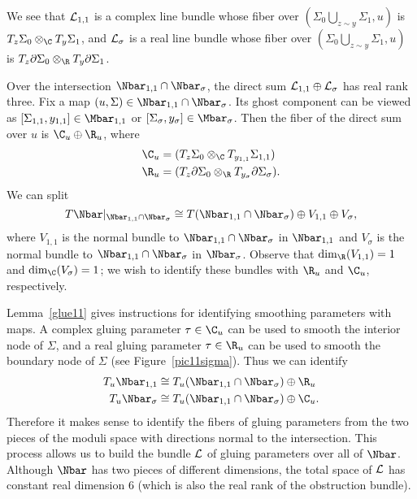 \begin{remark} \label{howToGlue11}
We see that $\mathcal{L}_{1,1}$ is a complex line bundle whose fiber over $(\Sigma_0 \bigcup_{z \sim y} \Sigma_1, u)$ is $T_z\Sigma_0 \otimes_\C T_y\Sigma_1$, and $\mathcal{L}_\sigma$ is a real line bundle whose fiber over $(\Sigma_0 \bigcup_{z \sim y} \Sigma_1, u)$ is $T_z\partial\Sigma_0 \otimes_\R T_y\partial\Sigma_1$.

Over the intersection $\Nbar_{1,1} \cap \Nbar_\sigma$, the direct sum $\mathcal{L}_{1,1} \oplus \mathcal{L}_\sigma$ has real rank three. 
Fix a map $(u,\Sigma) \in \Nbar_{1,1} \cap \Nbar_\sigma$. Its ghost component can be viewed as $[\Sigma_{1,1},y_{1,1}] \in \Mbar_{1,1}$ or $[\Sigma_\sigma,y_\sigma] \in \Mbar_\sigma$. 
Then the fiber of the direct sum over $u$ is $\C_u \oplus \R_u$, where
\begin{align*}
\C_u & = (T_z\Sigma_0 \otimes_\C T_{y_{1,1}}\Sigma_{1,1})
\\
\R_u & = (T_z\partial\Sigma_0 \otimes_\R T_{y_\sigma}\partial\Sigma_\sigma).
\end{align*}
We can split
\[
T\Nbar|_{\Nbar_{1,1} \cap \Nbar_\sigma} \cong T(\Nbar_{1,1} \cap \Nbar_\sigma) \oplus V_{1,1} \oplus V_\sigma,
\]
where $V_{1,1}$ is the normal bundle to $\Nbar_{1,1} \cap \Nbar_\sigma$ in $\Nbar_{1,1}$ and $V_\sigma$ is the normal bundle to $\Nbar_{1,1} \cap \Nbar_\sigma$ in $\Nbar_\sigma$. Observe that $\dim_\R(V_{1,1})=1$ and $\dim_\C(V_\sigma)=1$; we wish to identify these bundles with $\R_u$ and $\C_u$, respectively.

Lemma~\ref{glue11} gives instructions for identifying smoothing parameters with maps. A complex gluing parameter $\tau \in \C_u$ can be used to smooth the interior node of $\Sigma$, and a real gluing parameter $\tau \in \R_u$ can be used to smooth the boundary node of $\Sigma$ (see Figure~\ref{pic11sigma}). Thus we can identify 
\begin{align*}
T_u\Nbar_{1,1} & \cong T_u(\Nbar_{1,1} \cap \Nbar_\sigma) \oplus \R_u
\\
T_u\Nbar_\sigma & \cong T_u(\Nbar_{1,1} \cap \Nbar_\sigma) \oplus \C_u.
\end{align*}
Therefore it makes sense to identify the fibers of gluing parameters from the two pieces of the moduli space with directions normal to the intersection. 
This process allows us to build the bundle $\mathcal{L}$ of gluing parameters over all of $\Nbar$. Although $\Nbar$ has two pieces of different dimensions, the total space of $\mathcal{L}$ has constant real dimension $6$ (which is also the real rank of the obstruction bundle).
\end{remark}

